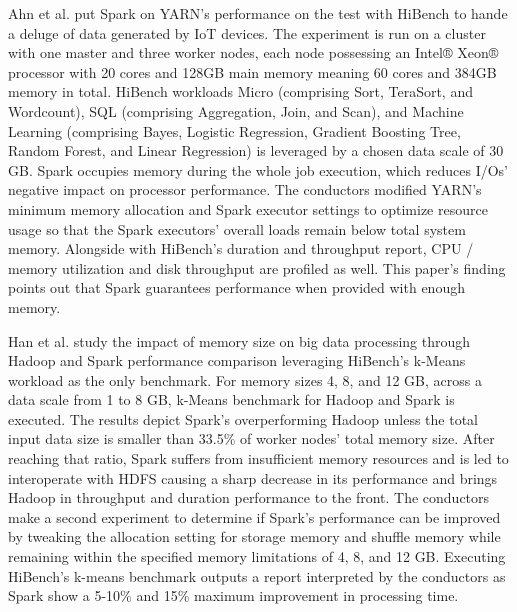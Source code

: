 \documentclass[review]{elsarticle}
\begin{document}
Ahn et al. \cite{ahn_performance_2018} put Spark on YARN's performance on the test with HiBench to hande a deluge of data generated by IoT devices. The experiment is run on a cluster with one master and three worker nodes, each node possessing an Intel® Xeon® processor with 20 cores and 128GB main memory meaning 60 cores and 384GB memory in total. HiBench workloads Micro (comprising Sort, TeraSort, and Wordcount), SQL (comprising Aggregation, Join, and Scan), and Machine Learning (comprising Bayes, Logistic Regression, Gradient Boosting Tree, Random Forest, and Linear Regression) is leveraged by a chosen data scale of 30 GB. Spark occupies memory during the whole job execution, which reduces I/Os' negative impact on processor performance. The conductors modified YARN's minimum memory allocation and Spark executor settings to optimize resource usage so that the Spark executors' overall loads remain below total system memory. Alongside with HiBench's duration and throughput report, CPU / memory utilization and disk throughput are profiled as well. This paper's finding points out that Spark guarantees performance when provided with enough memory.

Han et al. \cite{han_impact_2017} study the impact of memory size on big data processing through Hadoop and Spark performance comparison leveraging HiBench's k-Means workload as the only benchmark. For memory sizes 4, 8, and 12 GB, across a data scale from 1 to 8 GB, k-Means benchmark for Hadoop and Spark is executed. The results depict Spark's overperforming Hadoop unless the total input data size is smaller than 33.5\% of worker nodes' total memory size. After reaching that ratio, Spark suffers from insufficient memory resources and is led to interoperate with HDFS causing a sharp decrease in its performance and brings Hadoop in throughput and duration performance to the front. The conductors make a second experiment to determine if Spark's performance can be improved by tweaking the allocation setting for storage memory and shuffle memory while remaining within the specified memory limitations of 4, 8, and 12 GB. Executing HiBench's k-means benchmark outputs a report interpreted by the conductors as Spark show a 5-10\% and 15\% maximum improvement in processing time.
\end{document}
